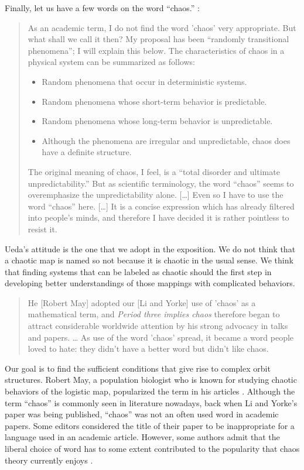 \documentclass[10pt,twoside,draft]{book}
\begin{document}
Finally, let us have a few words on the word ``chaos.''
\citet[p.24]{ueda-abraham}:
\begin{quotation}
  As an academic term, I do not find the word 'chaos' very appropriate.
  But what shall we call it then?
  My proposal has been ``randomly transitional phenomena''; I will explain this below.
  The characteristics of chaos in a physical system can be summarized as follows:
  \begin{itemize}
    \item Random phenomena that occur in deterministic systems.
    \item Random phenomena whose short-term behavior is predictable.
    \item Random phenomena whose long-term behavior is unpredictable.
    \item Although the phenomena are irregular and unpredictable, chaos does have a definite structure.
  \end{itemize}
  The original meaning of chaos, I feel, is a ``total disorder and ultimate unpredictability.''
  But as scientific terminology, the word ``chaos'' seems to overemphasize the unpredictability alone.
  [\ldots]
  Even so I have to use the word ``chaos'' here. [\ldots]
  It is a concise expression which has already filtered into people's minds, and therefore I have decided it is rather pointless to resist it.
\end{quotation}
Ueda's attitude is the one that we adopt in the exposition.
We do not think that a chaotic map is named so not because it is chaotic in the usual sense.
We think that finding systems that can be labeled as chaotic should the first step in developing better understandings of those mappings with complicated behaviors.
\begin{quotation}
  He [Robert May] adopted our [Li and Yorke] use of 'chaos' as a mathematical term, and \textit{Period three implies chaos} therefore began to attract considerable worldwide attention by his strong advocacy in talks and papers.
  \ldots
  As use of the word 'chaos' spread, it became a word people loved to hate: they didn't have a better word but didn't like chaos.
  \citep[p.205]{ueda-abraham}
\end{quotation}
Our goal is to find the sufficient conditions that give rise to complex orbit structures.
Robert May, a population biologist who is known for studying chaotic behaviors of the logistic map, popularized the term in his articles \citeyearpar{may1,may2}.
Although the term ``chaos'' is commonly seen in literature nowadays, back when Li and Yorke's paper was being published, ``chaos'' was not an often used word in academic papers.
Some editors considered the title of their paper to be inappropriate for a language used in an academic article.
However, some authors admit that the liberal choice of word has to some extent contributed to the popularity that chaos theory currently enjoys \citep[``Exploring Chaos on an Interval'']{ueda-abraham}.
\end{document}
